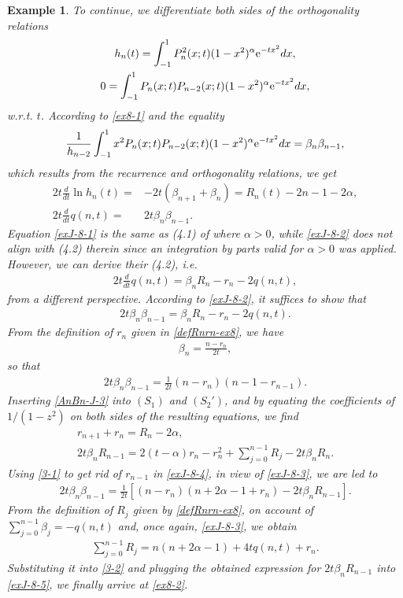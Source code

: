 \documentclass[12pt,a4paper]{article}    %
\newcommand{\e}{{\rm e}}
\newtheorem{exm}{Example}
\numberwithin{equation}{section}
\begin{document}
\begin{exm}
To continue, we differentiate both sides of the orthogonality relations
\begin{gather*}
h_n(t)=\int_{-1}^1P_n^2(x;t)(1-x^2)^{\alpha}\e^{-tx^2}dx,\\
0=\int_{-1}^1P_n(x;t)P_{n-2}(x;t)(1-x^2)^{\alpha}\e^{-tx^2}dx,
\end{gather*}
w.r.t. $t$. According to \eqref{ex8-1} and the equality
\[\frac{1}{h_{n-2}}\int_{-1}^1x^2P_n(x;t)P_{n-2}(x;t)(1-x^2)^{\alpha}\e^{-tx^2}dx=\beta_n\beta_{n-1},\]
which results from the recurrence and orthogonality relations, we get
\begin{align}
2t\frac{d}{dt}\ln h_n(t)=&-2t(\beta_{n+1}+\beta_n)=R_n(t)-2n-1-2\alpha,\label{exJ-8-1}\\
2t\frac{d}{dt}q(n,t)=&2t\beta_n\beta_{n-1}.\label{exJ-8-2}
\end{align}
Equation \eqref{exJ-8-1} is the same as (4.1) of \cite{MinChen22} where $\alpha>0$, while \eqref{exJ-8-2} does not align with (4.2) therein since an integration by parts valid for $\alpha>0$ was applied.
However, we can derive their (4.2), i.e.
 \begin{align*}
 2t\frac{d}{dt}q(n,t)=\beta_nR_n-r_n-2q(n,t),
 \end{align*}
 from a different perspective. According to \eqref{exJ-8-2}, it suffices to show that
 \begin{align}\label{ex8-2}
2t\beta_n\beta_{n-1}=\beta_nR_n-r_n-2q(n,t).
\end{align}
From the definition of $r_n$ given in \eqref{defRnrn-ex8}, we have
 \begin{align}\label{exJ-8-3}
 \beta_n=\frac{n-r_n}{2t},
 \end{align}
so that
\begin{align}\label{exJ-8-4}
2t\beta_n\beta_{n-1}=\frac{1}{2t}(n-r_n)(n-1-r_{n-1}).
\end{align}
Inserting \eqref{AnBn-J-3} into $(S_1)$ and $(S_2')$, and by equating the coefficients of $1/(1-z^2)$ on both sides of the resulting equations, we find
\begin{gather}
r_{n+1}+r_n=R_n-2\alpha,\label{3-1}\\
2t\beta_nR_{n-1}=2(t-\alpha)r_n-r_n^2+\sum_{j=0}^{n-1}R_j-2t\beta_nR_n.\label{3-2}
\end{gather}
Using \eqref{3-1} to get rid of $r_{n-1}$ in \eqref{exJ-8-4}, in view of \eqref{exJ-8-3}, we are led to
\begin{align}\label{exJ-8-5}
2t\beta_n\beta_{n-1}=\frac{1}{2t}\left[(n-r_n)(n+2\alpha-1+r_n)- 2t\beta_nR_{n-1}\right].
\end{align}
From the definition of $R_j$ given by \eqref{defRnrn-ex8}, on account of $\sum\limits_{j=0}^{n-1}\beta_j=-q(n,t)$ and, once again, \eqref{exJ-8-3}, we obtain \begin{align}\label{3-4}
\sum_{j=0}^{n-1}R_j=n(n+2\alpha-1)+4tq(n,t)+r_n.
\end{align}
Substituting it into \eqref{3-2} and plugging the obtained expression for $2t\beta_nR_{n-1}$ into \eqref{exJ-8-5}, we finally arrive at \eqref{ex8-2}.
\\
\\


\end{exm}
\end{document}
